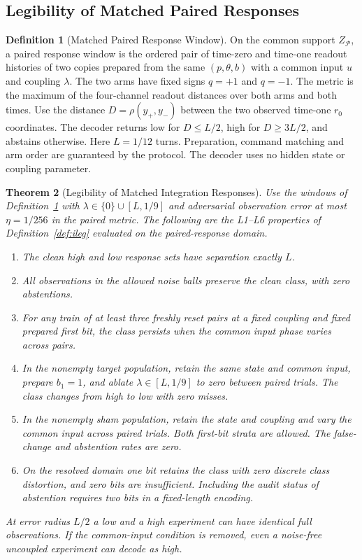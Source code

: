 \documentclass[11pt,a4paper]{article}
\newtheorem{theorem}{Theorem}[section]
\theoremstyle{definition}
\newtheorem{definition}[theorem]{Definition}
\begin{document}
\subsection{Legibility of Matched Paired Responses}

\begin{definition}[Matched Paired Response Window]\label{def:matched-paired-response-window}
On the common support $Z_{\mathcal P}$, a paired response window is the ordered pair of time-zero and time-one readout histories of two copies prepared from the same $(p,\theta,b)$ with a common input $u$ and coupling $\lambda$. The two arms have fixed signs $q=+1$ and $q=-1$. The metric is the maximum of the four-channel readout distances over both arms and both times. Use the distance $D=\rho(y_+,y_-)$ between the two observed time-one $r_0$ coordinates. The decoder returns low for $D\le L/2$, high for $D\ge 3L/2$, and abstains otherwise. Here $L=1/12$ turns. Preparation, command matching and arm order are guaranteed by the protocol. The decoder uses no hidden state or coupling parameter.
\end{definition}

\begin{theorem}[Legibility of Matched Integration Responses]\label{thm:matched-integration-legibility}
Use the windows of Definition~\ref{def:matched-paired-response-window} with $\lambda\in\{0\}\cup[L,1/9]$ and adversarial observation error at most $\eta=1/256$ in the paired metric. The following are the L1--L6 properties of Definition~\ref{def:ileg} evaluated on the paired-response domain.
\begin{enumerate}[leftmargin=1.5em]
\item The clean high and low response sets have separation exactly $L$.
\item All observations in the allowed noise balls preserve the clean class, with zero abstentions.
\item For any train of at least three freshly reset pairs at a fixed coupling and fixed prepared first bit, the class persists when the common input phase varies across pairs.
\item In the nonempty target population, retain the same state and common input, prepare $b_1=1$, and ablate $\lambda\in[L,1/9]$ to zero between paired trials. The class changes from high to low with zero misses.
\item In the nonempty sham population, retain the state and coupling and vary the common input across paired trials. Both first-bit strata are allowed. The false-change and abstention rates are zero.
\item On the resolved domain one bit retains the class with zero discrete class distortion, and zero bits are insufficient. Including the audit status of abstention requires two bits in a fixed-length encoding.
\end{enumerate}
At error radius $L/2$ a low and a high experiment can have identical full observations. If the common-input condition is removed, even a noise-free uncoupled experiment can decode as high.
\end{theorem}
\end{document}
